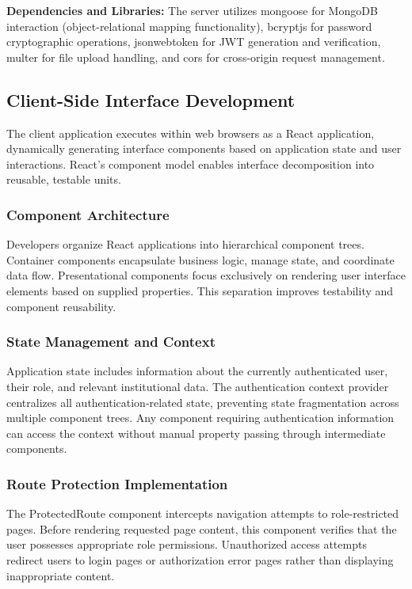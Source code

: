 \documentclass[conference]{IEEEtran}
\begin{document}
\textbf{Dependencies and Libraries:} The server utilizes mongoose for MongoDB interaction (object-relational mapping functionality), bcryptjs for password cryptographic operations, jsonwebtoken for JWT generation and verification, multer for file upload handling, and cors for cross-origin request management.

\subsection{Client-Side Interface Development}
\label{subsec:frontend}

The client application executes within web browsers as a React application, dynamically generating interface components based on application state and user interactions. React's component model enables interface decomposition into reusable, testable units.

\subsubsection{Component Architecture}
Developers organize React applications into hierarchical component trees. Container components encapsulate business logic, manage state, and coordinate data flow. Presentational components focus exclusively on rendering user interface elements based on supplied properties. This separation improves testability and component reusability.

\subsubsection{State Management and Context}
Application state includes information about the currently authenticated user, their role, and relevant institutional data. The authentication context provider centralizes all authentication-related state, preventing state fragmentation across multiple component trees. Any component requiring authentication information can access the context without manual property passing through intermediate components.

\subsubsection{Route Protection Implementation}
The ProtectedRoute component intercepts navigation attempts to role-restricted pages. Before rendering requested page content, this component verifies that the user possesses appropriate role permissions. Unauthorized access attempts redirect users to login pages or authorization error pages rather than displaying inappropriate content.
\end{document}
